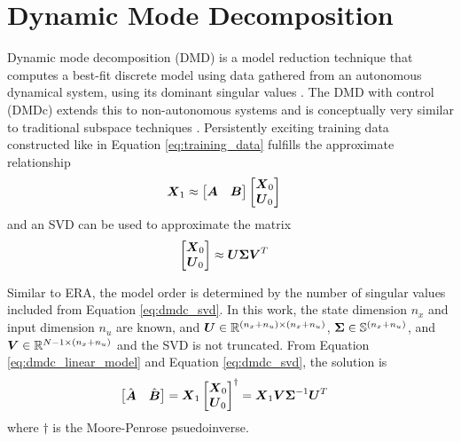 \section{Dynamic Mode Decomposition}
Dynamic mode decomposition (DMD) is a model reduction technique that computes a best-fit discrete model using data gathered from an autonomous dynamical system, using its dominant singular values \cite{schmid2010dynamic, schmid2011applications}.  The DMD with control (DMDc) extends this to non-autonomous systems and is conceptually very similar to traditional subspace techniques \cite{proctor2016dmdc, shin2020unifying}.  Persistently exciting training data constructed like in Equation \eqref{eq:training_data} fulfills the approximate relationship
\begin{equation}
\label{eq:dmdc_linear_model}
\begin{aligned}
	\vb*{X}_{1} &\approx \begin{bmatrix} \vb*{A} & \vb*{B} \end{bmatrix} \begin{bmatrix} \vb*{X}_{0} \\ \vb*{U}_{0} \end{bmatrix}
\end{aligned}
\end{equation}
and an SVD can be used to approximate the matrix
\begin{equation}
\label{eq:dmdc_svd}
\begin{aligned}
	\begin{bmatrix} \vb*{X}_{0} \\ \vb*{U}_{0} \end{bmatrix} &\approx \vb*{U}\vb*{\Sigma}\vb*{V}^{T}
\end{aligned}
\end{equation}

Similar to ERA, the model order is determined by the number of singular values included from Equation \eqref{eq:dmdc_svd}.  In this work, the state dimension $n_{x}$ and input dimension $n_{u}$ are known, and $\vb*{U} \in \mathbb{R}^{(n_{x}+n_{u}) \times (n_{x}+n_{u})}$, $\vb*{\Sigma} \in \mathbb{S}^{(n_{x}+n_{u})}$, and $\vb*{V} \in \mathbb{R}^{N-1 \times (n_{x}+n_{u})}$ and the SVD is not truncated.  From Equation \eqref{eq:dmdc_linear_model} and Equation \eqref{eq:dmdc_svd}, the solution is
\begin{equation}
\label{eq:dmdc_solution}
\begin{aligned}
	\begin{bmatrix} \hat{\vb*{A}} & \hat{\vb*{B}} \end{bmatrix} &= \vb*{X}_{1} \begin{bmatrix} \vb*{X}_{0} \\ \vb*{U}_{0} \end{bmatrix}^{\dagger}
	= \vb*{X}_{1} \vb*{V}\vb*{\Sigma}^{-1}\vb*{U}^{T}
\end{aligned}
\end{equation}
where $\dagger$ is the Moore-Penrose psuedoinverse.

